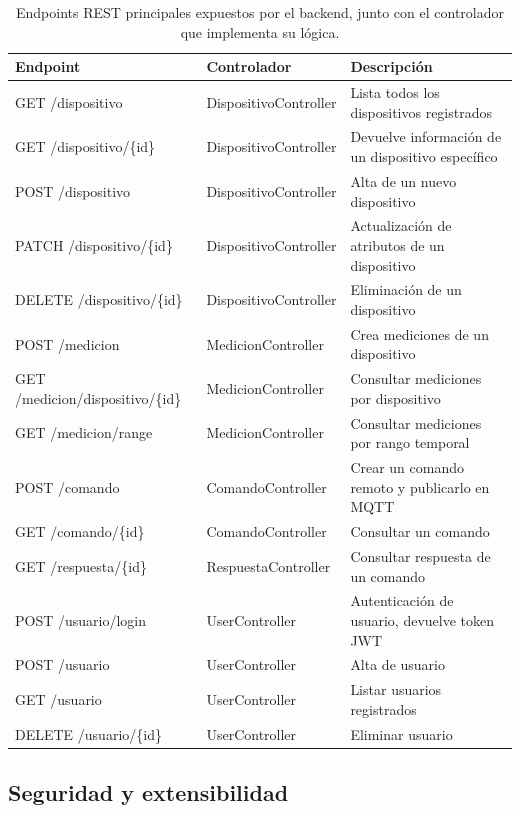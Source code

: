 \begin{table}[H]
	\centering
	\caption[Endpoints REST principales]{Endpoints REST principales expuestos por el backend, junto con el controlador que implementa su lógica.}
	\begin{tabular}{l l p{3.5cm}}    
		\toprule
		\textbf{Endpoint} & \textbf{Controlador} & \textbf{Descripción} \\
		\midrule
		GET /dispositivo & DispositivoController & Lista todos los dispositivos registrados \\
		GET /dispositivo/\{id\} & DispositivoController & Devuelve información de un dispositivo específico \\
		POST /dispositivo & DispositivoController & Alta de un nuevo dispositivo \\
		PATCH /dispositivo/\{id\} & DispositivoController & Actualización de atributos de un dispositivo \\
		DELETE /dispositivo/\{id\} & DispositivoController & Eliminación de un dispositivo \\
		\addlinespace
		POST /medicion & MedicionController & Crea  mediciones de un dispositivo \\
		GET /medicion/dispositivo/\{id\} & MedicionController & Consultar mediciones por dispositivo \\
		GET /medicion/range & MedicionController & Consultar mediciones por rango temporal \\
		\addlinespace
		POST /comando & ComandoController & Crear un comando remoto y publicarlo en MQTT \\
		GET /comando/\{id\} & ComandoController & Consultar un comando  \\
		\addlinespace
		GET /respuesta/\{id\} & RespuestaController & Consultar respuesta de un comando \\
		\addlinespace
		POST /usuario/login & UserController & Autenticación de usuario, devuelve token JWT \\
		POST /usuario & UserController & Alta de usuario \\
		GET /usuario & UserController & Listar usuarios registrados \\
		DELETE /usuario/\{id\} & UserController & Eliminar usuario \\
		\bottomrule
		\hline
	\end{tabular}
	\label{tab:endpoints}
\end{table}


\subsection{Seguridad y extensibilidad}

